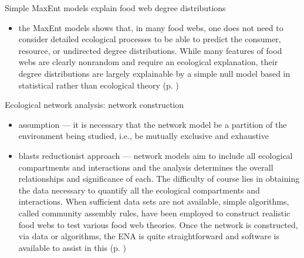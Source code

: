 \documentclass[twoside]{article}	%
\begin{document}
 Simple MaxEnt models explain food web degree distributions
\begin{itemize}
  \item the MaxEnt models shows that, in many food webs, one does not need to consider detailed ecological processes to be able to predict the consumer, resource, or undirected degree distributions. While many features of food webs are clearly nonrandom and require an ecological explanation, their degree distributions are largely explainable by a simple null model based in statistical rather than ecological theory (p. )
\end{itemize}


 Ecological network analysis: network construction
\begin{itemize}
  \item assumption --- it is necessary that the network model be a partition of the environment being studied, i.e., be mutually exclusive and exhaustive
  \item blasts reductionist approach ---  network models aim to include all ecological compartments and interactions and the analysis determines the overall relationships and significance of each. The difficulty of course lies in obtaining the data necessary to quantify all the ecological compartments and interactions. When sufficient data sets are not available, simple algorithms, called community assembly rules, have been employed to construct realistic food webs to test various food web theories. Once the network is constructed, via data or algorithms, the ENA is quite straightforward and software is available to assist in this (p.  )
\end{itemize}
\end{document}
